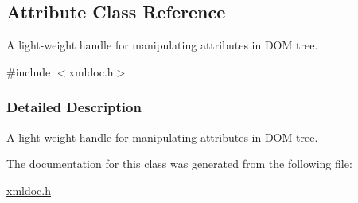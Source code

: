 \hypertarget{classAttribute}{
\subsection{Attribute Class Reference}
\label{classAttribute}
}


A light-\/weight handle for manipulating attributes in DOM tree.  




{\ttfamily \#include $<$xmldoc.h$>$}



\subsubsection{Detailed Description}
A light-\/weight handle for manipulating attributes in DOM tree. 

The documentation for this class was generated from the following file:\begin{DoxyCompactItemize}
\item 
\hyperlink{xmldoc_8h}{xmldoc.h}\end{DoxyCompactItemize}
